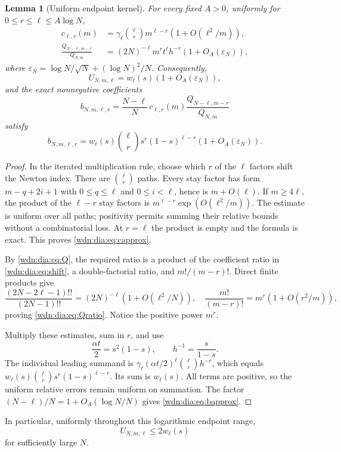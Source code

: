 \documentclass[11pt,letterpaper]{article}
\newtheorem{lemma}[theorem]{Lemma}
\theoremstyle{remark}\newtheorem{remark}[theorem]{Remark}
\begin{document}
\begin{lemma}[Uniform endpoint kernel]\label{wdn:dia:lem:endpoint}
For every fixed $A>0$, uniformly for $0\le r\le\ell\le A\log N$,
\begin{align}
 c_{\ell,r}(m)&=\gamma_\ell\binom\ell r m^{\ell-r}
                   (1+O(\ell^2/m)),\label{wdn:dia:eq:capprox}\\
 \frac{Q_{N-\ell,m-r}}{Q_{N,m}}
   &=(2N)^{-\ell}m^r t^\ell h^{-r}(1+O_A(\varepsilon_N)),\label{wdn:dia:eq:Qratio}
\end{align}
where $\varepsilon_N=\log N/\sqrt N+(\log N)^2/N$. Consequently,
\begin{equation}\label{wdn:dia:eq:Uendpoint}
 U_{N,m,\ell}=w_\ell(s)(1+O_A(\varepsilon_N)),
\end{equation}
and the exact nonnegative coefficients
\begin{equation}\label{wdn:dia:eq:kernel}
 b_{N,m,\ell,r}=\frac{N-\ell}{N}\,
 c_{\ell,r}(m)\frac{Q_{N-\ell,m-r}}{Q_{N,m}}
\end{equation}
satisfy
\begin{equation}\label{wdn:dia:eq:bapprox}
 b_{N,m,\ell,r}=w_\ell(s)\binom\ell r s^r(1-s)^{\ell-r}
                     (1+O_A(\varepsilon_N)).
\end{equation}
\end{lemma}
\begin{proof}
In the iterated multiplication rule, choose which $r$ of the $\ell$ factors
shift the Newton index. There are $\binom\ell r$ paths. Every stay factor
has form $m-q+2i+1$ with $0\le q\le\ell$ and $0\le i<\ell$, hence is
$m+O(\ell)$. If $m\ge4\ell$, the product of the $\ell-r$ stay factors is
$m^{\ell-r}\exp(O(\ell^2/m))$. The estimate is uniform over all paths;
positivity permits summing their relative bounds without a combinatorial
loss. At $r=\ell$ the product is empty and the formula is exact.
This proves \eqref{wdn:dia:eq:capprox}.

By \eqref{wdn:dia:eq:Q}, the required ratio is a product of the coefficient ratio
in \eqref{wdn:dia:eq:shift}, a double-factorial ratio, and $m!/(m-r)!$. Direct finite
products give
\[
 \frac{(2N-2\ell-1)!!}{(2N-1)!!}
 =(2N)^{-\ell}(1+O(\ell^2/N)),\quad
 \frac{m!}{(m-r)!}=m^r(1+O(r^2/m)),
\]
proving \eqref{wdn:dia:eq:Qratio}. Notice the positive power $m^r$.

Multiply these estimates, sum in $r$, and use
\begin{equation}\label{wdn:dia:eq:saddleidentities}
 \frac{\alpha t}{2}=s^2(1-s),\qquad h^{-1}=\frac{s}{1-s}.
\end{equation}
The individual leading summand is
$\gamma_\ell(\alpha t/2)^\ell\binom\ell r h^{-r}$, which equals
$w_\ell(s)\binom\ell r s^r(1-s)^{\ell-r}$. Its sum is $w_\ell(s)$.
All terms are positive, so the uniform relative errors remain uniform on
summation. The factor $(N-\ell)/N=1+O_A(\log N/N)$ gives \eqref{wdn:dia:eq:bapprox}.
\end{proof}
In particular, uniformly throughout this logarithmic endpoint range,
\begin{equation}\label{wdn:dia:eq:Udom}
 U_{N,m,\ell}\le2w_\ell(s)
\end{equation}
for sufficiently large $N$.
\end{document}

